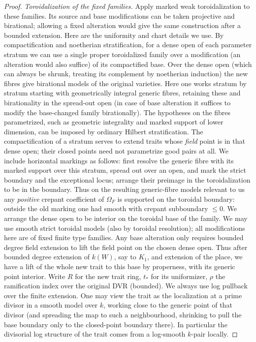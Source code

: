\begin{proof}
\emph{Toroidalization of the fixed families.}
Apply marked weak toroidalization
\cite[Theorem 1.1]{AbramovichDenefKaru} to these families.
Its source and base modifications can be taken projective and
birational; allowing a fixed alteration would give the same construction
after a bounded extension.
Here are the uniformity and chart details we use.
By compactification and noetherian stratification, for a dense open of each parameter stratum we can use a single proper toroidalized family over a modification (an alteration would also suffice) of its compactified base.
Over the dense open (which can always be shrunk, treating its complement by noetherian induction) the new fibres give birational models of the original varieties.
Here one works stratum by stratum starting with geometrically integral generic fibres, retaining these and birationality in the spread-out open (in case of base alteration it suffices to modify the base-changed family birationally).
The hypotheses on the fibres parametrized, such as geometric integrality and marked support of lower dimension, can be imposed by ordinary Hilbert stratification.
The compactification of a stratum serves to extend traits whose \emph{field} point is in that dense open; their closed points need not parametrize good pairs at all.
We include horizontal markings as follows: first resolve the generic fibre with its marked support over this stratum, spread out over an open, and mark the strict boundary and the exceptional locus; arrange their preimage in the toroidalization to be in the boundary.
Thus on the resulting generic-fibre models relevant to us any \emph{positive} crepant coefficient of \(\Omega_F\) is supported on the toroidal boundary: outside the old marking one had smooth with crepant subboundary \(\le0\).
We arrange the dense open to be interior on the toroidal base of the family.
We may use smooth strict toroidal models (also by toroidal resolution); all modifications here are of fixed finite type families.
Any base alteration only requires bounded degree field extension to lift the field point on the chosen dense open.
Thus after bounded degree extension of \(k(W)\), say to \(K_1\), and extension of the place, we have a lift of the whole new trait to this base by properness, with its generic point interior.
Write \(R\) for the new trait ring, \(t_*\) for its uniformizer, \(\rho\) the ramification index over the original DVR (bounded).
We always use log pullback over the finite extension.
One may view the trait as the localization at a prime divisor in a smooth model over \(k\), working close to the generic point of that divisor (and spreading the map to such a neighbourhood, shrinking to pull the base boundary only to the closed-point boundary there).
In particular the divisorial log structure of the trait comes from a log-smooth \(k\)-pair locally.


\end{proof}
